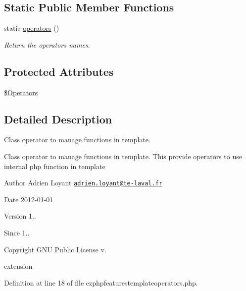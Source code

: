 \subsection*{Static Public Member Functions}
\begin{DoxyCompactItemize}
\item 
static \hyperlink{classextension_1_1ezextrafeatures_1_1autoloads_1_1e_z_p_h_p_features_template_operators_ae6a272bb5df9fd90b9460882ddb4bc5b}{operators} ()
\begin{DoxyCompactList}\small\item\em Return the operators names. \end{DoxyCompactList}\end{DoxyCompactItemize}
\subsection*{Protected Attributes}
\begin{DoxyCompactItemize}
\item 
\hyperlink{classextension_1_1ezextrafeatures_1_1autoloads_1_1e_z_p_h_p_features_template_operators_abc89a74964f1487af8cff59bf0ddab4c}{\$\-Operators}
\end{DoxyCompactItemize}


\subsection{Detailed Description}
Class operator to manage functions in template. 

Class operator to manage functions in template. This provide operators to use internal php function in template

\begin{DoxyAuthor}{Author}
Adrien Loyant \href{mailto:adrien.loyant@te-laval.fr}{\tt adrien.\-loyant@te-\/laval.\-fr}
\end{DoxyAuthor}
\begin{DoxyDate}{Date}
2012-\/01-\/01 
\end{DoxyDate}
\begin{DoxyVersion}{Version}
1.. 
\end{DoxyVersion}
\begin{DoxySince}{Since}
1.. 
\end{DoxySince}
\begin{DoxyCopyright}{Copyright}
G\-N\-U Public License v.
\end{DoxyCopyright}
extension 

Definition at line 18 of file ezphpfeaturestemplateoperators.\-php.



